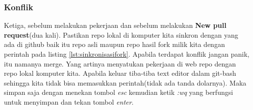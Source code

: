 \subsubsection{Konflik}
Ketiga, sebelum melakukan pekerjaan dan sebelum melakukan \textbf{New pull request}(dua kali). Pastikan repo lokal di komputer kita sinkron dengan yang ada di github baik itu repo asli maupun repo hasil fork milik kita dengan perintah pada listing \ref{lst:sinkronisasifork}. Apabila terdapat konflik jangan panik, itu namanya merge. Yang artinya menyatukan pekerjaan di web repo dengan repo lokal komputer kita. Apabila keluar tiba-tiba text editor dalam git-bash sehingga kita tidak bisa memasukkan perintah(tidak ada tanda dolarnya). Maka simpan saja dengan menekan tombol \textit{esc} kemudian ketik \textit{:wq} yang berfungsi untuk menyimpan dan tekan tombol \textit{enter}.
